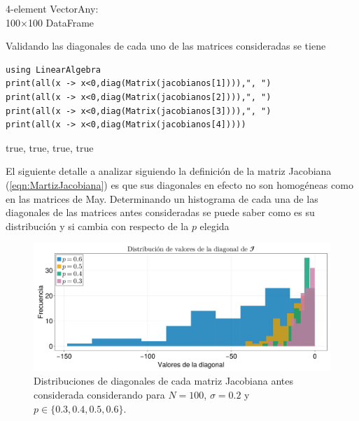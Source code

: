 \begin{tcolorbox}[colback=red!10!white, colframe=black, title=Salida]
4-element Vector{Any}:\\
100×100 DataFrame
\end{tcolorbox}

Validando las diagonales de cada uno de las matrices consideradas se tiene

\begin{tcolorbox}[colback=green!10!white, colframe=black, title=Entrada]
	\begin{verbatim}
using LinearAlgebra
print(all(x -> x<0,diag(Matrix(jacobianos[1]))),", ")
print(all(x -> x<0,diag(Matrix(jacobianos[2]))),", ")
print(all(x -> x<0,diag(Matrix(jacobianos[3]))),", ")
print(all(x -> x<0,diag(Matrix(jacobianos[4]))))
	\end{verbatim}
\end{tcolorbox}

\begin{tcolorbox}[colback=red!10!white, colframe=black, title=Salida]
true, true, true, true
\end{tcolorbox}
\newpage
El siguiente detalle a analizar siguiendo la definición de la matriz Jacobiana (\ref{eqn:MartizJacobiana}) es que sus diagonales en efecto no son homogéneas como en las matrices de May. Determinando un histograma de cada una de las diagonales de las matrices antes consideradas se puede saber como es su distribución y si cambia con respecto de la $p$ elegida
\begin{figure}[h!]
	\centering
	\includegraphics[scale=0.16]{../Imagenes/DistDiagonal}
	\caption{Distribuciones de diagonales de cada matriz Jacobiana antes considerada considerando para $N=100$, $\sigma=0.2$ y $p\in\{0.3,0.4,0.5,0.6\}$.}
	\label{fig:DistDiagonal}
\end{figure}

